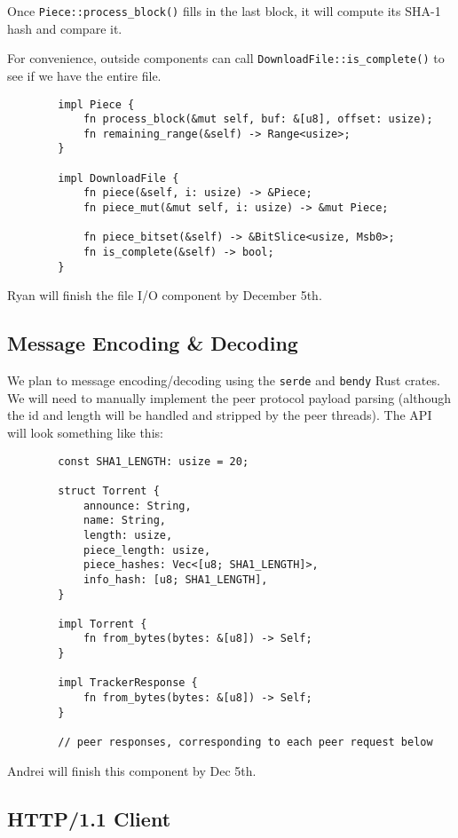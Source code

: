 \documentclass{article}
\begin{document}
    Once \verb|Piece::process_block()| fills in the last block, it will compute its SHA-1 hash and compare it.

    For convenience, outside components can call \verb|DownloadFile::is_complete()| to see if we have the entire file.

    \begin{verbatim}
        impl Piece {
            fn process_block(&mut self, buf: &[u8], offset: usize);
            fn remaining_range(&self) -> Range<usize>;
        }

        impl DownloadFile {
            fn piece(&self, i: usize) -> &Piece;
            fn piece_mut(&mut self, i: usize) -> &mut Piece;

            fn piece_bitset(&self) -> &BitSlice<usize, Msb0>;
            fn is_complete(&self) -> bool;
        }
    \end{verbatim}
    Ryan will finish the file I/O component by December 5th.

    \subsection{Message Encoding \& Decoding}

    We plan to message encoding/decoding using the \texttt{serde} and \texttt{bendy} Rust crates.
    We will need to manually implement the peer protocol payload parsing (although the id and length will be handled and stripped by the peer threads).
    The API will look something like this:
    \begin{verbatim}
        const SHA1_LENGTH: usize = 20;

        struct Torrent {
            announce: String,
            name: String,
            length: usize,
            piece_length: usize,
            piece_hashes: Vec<[u8; SHA1_LENGTH]>,
            info_hash: [u8; SHA1_LENGTH],
        }

        impl Torrent {
            fn from_bytes(bytes: &[u8]) -> Self;
        }

        impl TrackerResponse {
            fn from_bytes(bytes: &[u8]) -> Self;
        }

        // peer responses, corresponding to each peer request below
    \end{verbatim}
    Andrei will finish this component by Dec 5th.

    \subsection{HTTP/1.1 Client}
\end{document}
